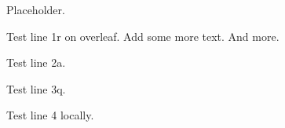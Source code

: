 

Placeholder.

Test line 1r on overleaf. Add some more text. And more.

Test line 2a.

Test line 3q.

Test line 4 locally.

